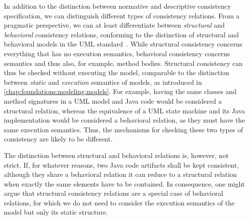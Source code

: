 In addition to the distinction between normative and descriptive consistency specification, we can distinguish different types of consistency relations.
From a pragmatic perspective, we can at least differentiate between \emph{structural} and \emph{behavioral} consistency relations, conforming to the distinction of structural and behavioral models in the \gls{UML} standard~\cite{uml}.
While structural consistency concerns everything that has no execution semantics, behavioral consistency concerns semantics and thus also, for example, method bodies.
Structural consistency can thus be checked without executing the model, comparable to the distinction between \emph{static} and \emph{execution} semantics of models, as introduced in \autoref{chap:foundations:modeling:models}.
For example, having the same classes and method signatures in a \gls{UML} model and Java code would be considered a structural relation, whereas the equivalence of a \gls{UML} state machine and its Java implementation would be considered a behavioral relation, as they must have the same execution semantics.
Thus, the mechanisms for checking these two types of consistency are likely to be different.

The distinction between structural and behavioral relations is, however, not strict.
If, for whatever reasons, two Java code artifacts shall be kept consistent, although they share a behavioral relation it can reduce to a structural relation when exactly the same elements have to be contained.
In consequence, one might argue that structural consistency relations are a special case of behavioral relations, for which we do not need to consider the execution semantics of the model but only its static structure.

